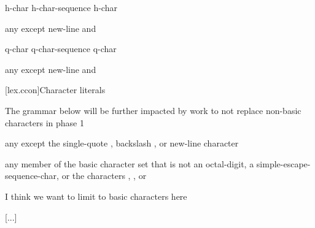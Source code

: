 \documentclass{wg21}
\begin{document}
\begin{bnf}
    \br
    h-char\br
    h-char-sequence h-char
\end{bnf}

\begin{bnf}
    \br
    \textnormal{any  except new-line and \terminal{>}}
\end{bnf}

\begin{bnf}
    \br
    q-char\br
    q-char-sequence q-char
\end{bnf}

\begin{bnf}
    \br
    \textnormal{any  except new-line and }
\end{bnf}


[lex.ccon]{Character literals}

\begin{quoteblock}
The grammar below will be further impacted by work to not replace non-basic characters in phase 1
\end{quoteblock}

\begin{bnf}
\br
\textnormal{any  except the single-quote , backslash \terminal{\textbackslash}, or new-line character}
\end{bnf}


\begin{bnf}

\br
\textnormal{any member of the  basic character set} that is not an octal-digit\textnormal{, a} simple-escape-sequence-char\textnormal{, or the characters , , or }
\end{bnf}

\begin{quoteblock}
    I think we want to limit to basic characters here
\end{quoteblock}

[...]
\end{document}
